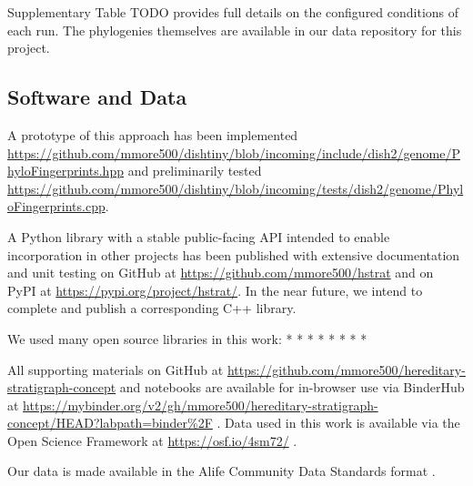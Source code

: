 Supplementary Table TODO provides full details on the configured conditions of each run.
The phylogenies themselves are available in our data repository for this project.


\subsection{Software and Data}

A prototype of this approach has been implemented \url{https://github.com/mmore500/dishtiny/blob/incoming/include/dish2/genome/PhyloFingerprints.hpp} and preliminarily tested \url{https://github.com/mmore500/dishtiny/blob/incoming/tests/dish2/genome/PhyloFingerprints.cpp}.

A Python library with a stable public-facing API intended to enable incorporation in other projects has been published with extensive documentation and unit testing on GitHub at \url{https://github.com/mmore500/hstrat} and on PyPI at \url{https://pypi.org/project/hstrat/}.
In the near future, we intend to complete and publish a corresponding C++ library.

We used many open source libraries in this work:
* \citep{sukumaran2010dendropy}
* \citep{cock2009biopython}
* \citep{virtanen2020scipy}
* \citep{hunter2007matplotlib}
* \citep{virtanen2020scipy}
* \citep{waskom2021seaborn}
* \citep{bostock2011d3}
* \citep{lalejini2019data}

All supporting materials on GitHub at \url{https://github.com/mmore500/hereditary-stratigraph-concept} and notebooks are available for in-browser use via BinderHub at \url{https://mybinder.org/v2/gh/mmore500/hereditary-stratigraph-concept/HEAD?labpath=binder%2F} \citep{ragan2018binder}.
Data used in this work is available via the Open Science Framework at
\url{https://osf.io/4sm72/} \citep{moreno2022hstratconceptsupplement} \citep{foster2017open}.

Our data is made available in the Alife Community Data Standards format \citep{lalejini2019data}.






